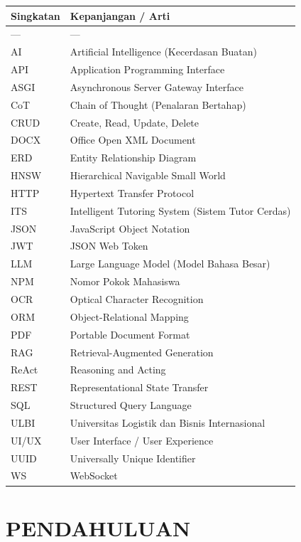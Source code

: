 \documentclass[12pt,a4paper]{article}
\begin{document}
\begin{table}[h]
\centering
\begin{tabular}{ll}
\toprule
Singkatan & Kepanjangan / Arti \\
\midrule
--- & --- \\
AI & Artificial Intelligence (Kecerdasan Buatan) \\
API & Application Programming Interface \\
ASGI & Asynchronous Server Gateway Interface \\
CoT & Chain of Thought (Penalaran Bertahap) \\
CRUD & Create, Read, Update, Delete \\
DOCX & Office Open XML Document \\
ERD & Entity Relationship Diagram \\
HNSW & Hierarchical Navigable Small World \\
HTTP & Hypertext Transfer Protocol \\
ITS & Intelligent Tutoring System (Sistem Tutor Cerdas) \\
JSON & JavaScript Object Notation \\
JWT & JSON Web Token \\
LLM & Large Language Model (Model Bahasa Besar) \\
NPM & Nomor Pokok Mahasiswa \\
OCR & Optical Character Recognition \\
ORM & Object-Relational Mapping \\
PDF & Portable Document Format \\
RAG & Retrieval-Augmented Generation \\
ReAct & Reasoning and Acting \\
REST & Representational State Transfer \\
SQL & Structured Query Language \\
ULBI & Universitas Logistik dan Bisnis Internasional \\
UI/UX & User Interface / User Experience \\
UUID & Universally Unique Identifier \\
WS & WebSocket \\
\bottomrule
\end{tabular}
\end{table}
\section*{PENDAHULUAN}
\end{document}
